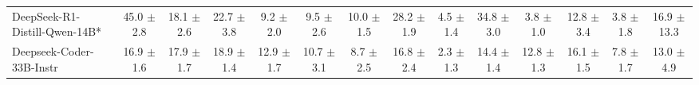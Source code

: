 \begin{table}[hbt]
{\begin{tabular}{l *{13}{c}}
\rowcolor{gray!10}
 DeepSeek-R1-Distill-Qwen-14B* &
45.0 {\tiny$\pm$ 2.8} &
18.1 {\tiny$\pm$ 2.6} &
22.7 {\tiny$\pm$ 3.8} &
9.2 {\tiny$\pm$ 2.0} &
9.5 {\tiny$\pm$ 2.6} &
10.0 {\tiny$\pm$ 1.5} &
28.2 {\tiny$\pm$ 1.9} &
4.5 {\tiny$\pm$ 1.4} &
34.8 {\tiny$\pm$ 3.0} &
3.8 {\tiny$\pm$ 1.0} &
12.8 {\tiny$\pm$ 3.4} &
3.8 {\tiny$\pm$ 1.8} &
16.9 {\tiny$\pm$ 13.3} \\


Deepseek-Coder-33B-Instr &
16.9 {\tiny$\pm$ 1.6} &
17.9 {\tiny$\pm$ 1.7} &
18.9 {\tiny$\pm$ 1.4} &
12.9 {\tiny$\pm$ 1.7} &
10.7 {\tiny$\pm$ 3.1} &
8.7 {\tiny$\pm$ 2.5} &
16.8 {\tiny$\pm$ 2.4} &
2.3 {\tiny$\pm$ 1.3} &
14.4 {\tiny$\pm$ 1.4} &
12.8 {\tiny$\pm$ 1.3} &
16.1 {\tiny$\pm$ 1.5} &
7.8 {\tiny$\pm$ 1.7} &
13.0 {\tiny$\pm$ 4.9} \\

\bottomrule
\end{tabular}%
}
\end{table}
